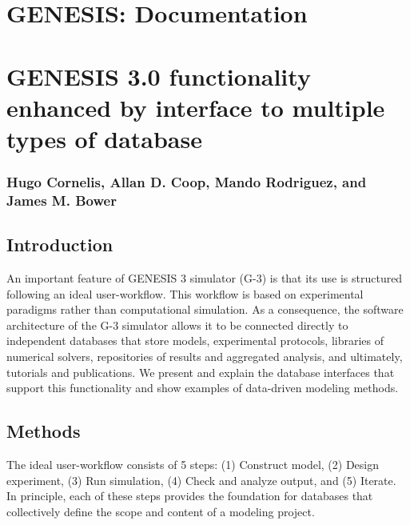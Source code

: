 \documentclass[12pt]{article}
\begin{document}
\section*{GENESIS: Documentation}

\section*{GENESIS 3.0 functionality enhanced by interface to multiple types of database}

\subsubsection*{Hugo Cornelis, Allan D. Coop, Mando Rodriguez, and James M. Bower}

\subsection*{Introduction}

An important feature of GENESIS 3 simulator (G-3) is that its use is
structured following an ideal user-workflow.  This workflow is based
on experimental paradigms rather than computational simulation.  As a
consequence, the software architecture of the G-3 simulator allows it
to be connected directly to independent databases that store models,
experimental protocols, libraries of numerical solvers, repositories
of results and aggregated analysis, and ultimately, tutorials and
publications.  We present and explain the database interfaces that
support this functionality and show examples of data-driven modeling
methods.



\subsection*{Methods}

The ideal user-workflow consists of 5 steps: (1) Construct model, (2)
Design experiment, (3) Run simulation, (4) Check and analyze output,
and (5) Iterate. In principle, each of these steps provides the
foundation for databases that collectively define the scope and
content of a modeling project.
\end{document}
